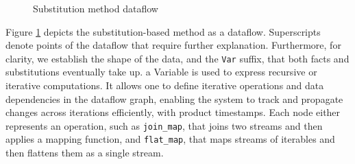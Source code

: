 \documentclass[sigconf,screen,review,natbib]{acmart}
\theoremstyle{definition}
\begin{document}
\begin{figure} [htb!]
	\caption{Substitution method dataflow}
	\label{fig:substitution_simple_ddflow}
\end{figure}
Figure \ref{fig:substitution_simple_ddflow} depicts the substitution-based method as a dataflow. Superscripts denote
points of the dataflow that require further explanation. Furthermore, for clarity, we establish the shape of the
data, and the \verb|Var| suffix, that both facts and substitutions eventually take up. a Variable is used to express
recursive or iterative computations. It allows one to define iterative operations and data dependencies in the dataflow
graph, enabling the system to track and propagate changes across iterations efficiently, with product timestamps. Each
node either represents an operation, such as \verb|join_map|, that joins two streams and then applies a mapping function,
and \verb|flat_map|, that maps streams of iterables and then flattens them as a single stream.
\end{document}
